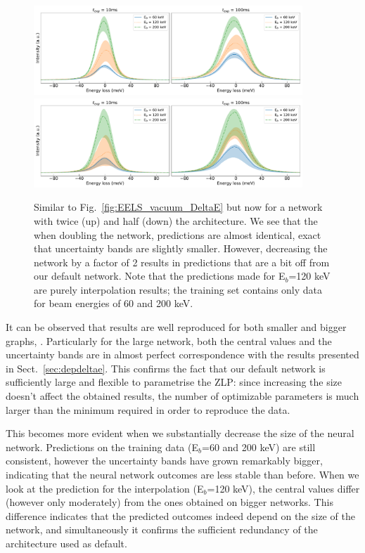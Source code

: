 \begin{figure}[H]
\centering
 \includegraphics[width=0.9\textwidth]{plots/Prediction_120keV_bignetwork.pdf}
 \includegraphics[width=0.9\textwidth]{plots/Prediction_120keV_smallnetwork.pdf}
 \caption{Similar to Fig.~\ref{fig:EELS_vacuum_DeltaE} but now
    for a network with twice (up) and half (down) the architecture. 
    We see that the when doubling the network, predictions are
    almost identical, exact that uncertainty bands are slightly smaller.
    However, decreasing the network by a factor of 2 results in predictions
    that are a bit off from our default network. 
    Note that the predictions made for E$_b$=120 keV are purely
    interpolation results; the training set contains only data for beam 
    energies of 60 and 200 keV.
    }
    \label{fig:EELS_vacuum_DeltaE_check}
\end{figure}
It can be observed that results are well
reproduced for both smaller and bigger graphs, . 
%
Particularly for the large network, both the central values and the uncertainty bands are 
in almost perfect correspondence with the results presented in Sect.~\ref{sec:depdeltae}. 
%
This confirms the fact that our default network is sufficiently large and flexible to parametrise
the ZLP: since increasing the size doesn't affect the obtained results, 
the number of optimizable parameters is much larger than the 
minimum required in order to reproduce the data.

This becomes more evident when we substantially decrease the size of the neural network.
Predictions on the training data (E$_b$=60 and 200 keV) are still consistent, however the uncertainty
bands have grown remarkably bigger, indicating that the neural network outcomes are less 
stable than before. 
%
When we look at the prediction for the interpolation (E$_b$=120 keV), the central 
values differ (however only moderately) from the ones obtained on bigger networks.
%
This difference indicates that the predicted outcomes indeed depend on the size of the network,
and simultaneously it confirms the sufficient redundancy of the architecture used as default. \\

